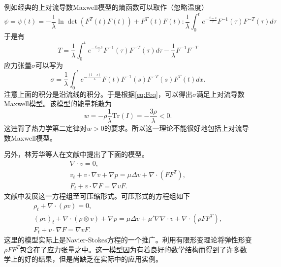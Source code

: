 例如经典的上对流导数Maxwell模型的熵函数可以取作（忽略温度）
\begin{equation*}
	\psi  = \psi(t) = - \frac{1}{\lambda}  \ln \det (F^T(t) F(t)) + F^T(t) F(t) : \frac{1}{\lambda}  \int_{0}^t e^{-\frac{t-s}{\tau}} F^{-1}(\tau) F^{-T}(\tau) d\tau 
\end{equation*}
于是有
\begin{equation*}
	T = \frac{1}{\lambda}  \int_{0}^t e^{-\frac{t-s}{\tau}} F^{-1}(\tau) F^{-T}(\tau) d\tau -\frac{1}{\lambda}  F^{-1} F^{-T} 
\end{equation*}
应力张量$\sigma$可以写为
\begin{equation*}
	\sigma = \frac{1}{\lambda} \int_{0}^{t} e^{-\frac{(t-s)}{\lambda} } F(t)  F^{-1}(s) F^{-T}(s) F^T(t)  dx.
\end{equation*}
注意上面的积分是沿流线的积分。于是根据\eqref{eq:Feq}，可以得出$\sigma$满足上对流导数Maxwell模型。该模型的能量耗散为
\begin{equation*}
	w = - \rho \frac{1}{\lambda} \mbox{Tr}(I) = -\frac{3\rho}{\lambda} < 0.
\end{equation*}
这违背了热力学第二定律对$w>0$的要求。所以这一理论不能很好地包括上对流导数Maxwell模型。


另外，林芳华等人在文献\cite{lin2005hydrodynamics}中提出了下面的模型。
\begin{subequations}\label{eq:linincompressible}
	\begin{align}
		\nabla \cdot v = 0, \\
		v_t + v \cdot \nabla v + \nabla p = \mu \Delta v + \nabla \cdot( F F^T), \\
		F_t + v \cdot \nabla F = \nabla v F.
	\end{align}
\end{subequations}
文献\cite{liu2008global}中发展这一方程组至可压缩形式。可压形式的方程组如下
\begin{subequations}\label{eq:lincompressible}
	\begin{align}
		\rho_t + \nabla \cdot (\rho v) = 0, \\
		(\rho v)_t + \nabla \cdot (\rho\otimes v) + \nabla p = \mu \Delta v + \mu' \nabla \nabla \cdot v+ \nabla \cdot( \rho F F^T), \\
		F_t + v \cdot \nabla F = \nabla v F.
	\end{align}
\end{subequations}
这里的模型实际上是Navier-Stokes方程的一个推广。利用有限形变理论将弹性形变$\rho F F^T$包含在了应力张量之中。这一模型因为有着良好的数学结构而得到了许多数学上的好的结果\cite{lin2012some}，但是尚缺乏在实际中的应用实例。

